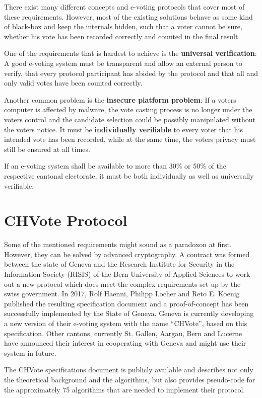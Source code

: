 There exist many different concepts and e-voting protocols that cover most of these requirements. However, most of the existing solutions behave as some kind of black-box and keep the internals hidden, such that a voter cannot be sure, whether his vote has been recorded correctly and counted in the final result. 

One of the requirements that is hardest to achieve is the \textbf{universal verification}: A good e-voting system must be transparent and allow an external person to verify, that every protocol participant has abided by the protocol and that all and only valid votes have been counted correctly.

Another common problem is the \textbf{insecure platform problem}: If a voters computer is affected by malware, the vote casting process is no longer under the voters control and the candidate selection could be possibly manipulated without the voters notice. It must be \textbf{individually verifiable} to every voter that his intended vote has been recorded, while at the same time, the voters privacy must still be ensured at all times. 

If an e-voting system shall be available to more than 30\% or 50\% of the respective cantonal electorate, it must be both individually as well as universally verifiable.

\section{CHVote Protocol}
Some of the mentioned requirements might sound as a paradoxon at first. However, they can be solved by advanced cryptography. A contract was formed between the state of Geneva and the  Research Institute for Security in the Information Society (RISIS) of the Bern University of Applied Sciences to work out a new protocol which does meet the complex requirements set up by the swiss government. In 2017, Rolf Haenni, Philipp Locher and Reto E. Koenig published the resulting specification document and a proof-of-concept has been successfully implemented by the State of Geneva. Geneva is currently developing a new version of their e-voting system with the name "`CHVote"', based on this specification. Other cantons, currently St. Gallen, Aargau, Bern and Lucerne have announced their interest in cooperating with Geneva and might use their system in future.

The CHVote specifications document is publicly available and describes not only the theoretical background and the algorithms, but also provides pseudo-code for the approximately 75 algorithms that are needed to implement their protocol.

